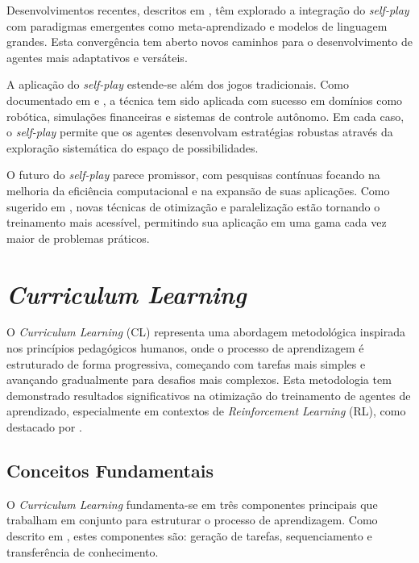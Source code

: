 Desenvolvimentos recentes, descritos em \cite{survey_self_play, survey_self_play_2024}, têm explorado a integração do \textit{self-play} com paradigmas emergentes como meta-aprendizado e modelos de linguagem grandes. Esta convergência tem aberto novos caminhos para o desenvolvimento de agentes mais adaptativos e versáteis.

A aplicação do \textit{self-play} estende-se além dos jogos tradicionais. Como documentado em \cite{survey_self_play_2024} e \cite{bruno_brandao}, a técnica tem sido aplicada com sucesso em domínios como robótica, simulações financeiras e sistemas de controle autônomo. Em cada caso, o \textit{self-play} permite que os agentes desenvolvam estratégias robustas através da exploração sistemática do espaço de possibilidades.

O futuro do \textit{self-play} parece promissor, com pesquisas contínuas focando na melhoria da eficiência computacional e na expansão de suas aplicações. Como sugerido em \cite{huggingface_self_play}, novas técnicas de otimização e paralelização estão tornando o treinamento mais acessível, permitindo sua aplicação em uma gama cada vez maior de problemas práticos.

\section{\textit{Curriculum Learning}}
\label{sec:curriculum}

O \textit{Curriculum Learning} (CL) representa uma abordagem metodológica inspirada nos princípios pedagógicos humanos, onde o processo de aprendizagem é estruturado de forma progressiva, começando com tarefas mais simples e avançando gradualmente para desafios mais complexos. Esta metodologia tem demonstrado resultados significativos na otimização do treinamento de agentes de aprendizado, especialmente em contextos de \textit{Reinforcement Learning} (RL), como destacado por \cite{curriculum_learning_a_survey}.

\subsection{Conceitos Fundamentais}
\label{subsec:curriculum_conceitos}

O \textit{Curriculum Learning} fundamenta-se em três componentes principais que trabalham em conjunto para estruturar o processo de aprendizagem. Como descrito em \cite{curriculum}, estes componentes são: geração de tarefas, sequenciamento e transferência de conhecimento.

